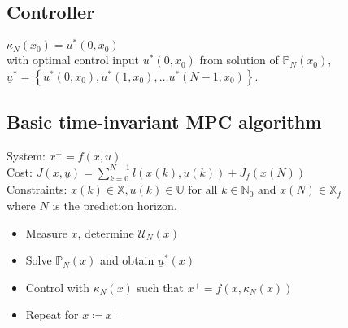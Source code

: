 \documentclass[english]{latex4ei/latex4ei_sheet}
\begin{document}
\begin{sectionbox}

\subsection{Controller}
$\kappa_{N}\left(x_{0}\right)=u^{*}\left(0, x_{0}\right)$ \\ 
with optimal control input $u^{*}\left(0, x_{0}\right)$ from solution of $\mathbb{P}_{N}\left(x_{0}\right)$, \\$\underline{u}^{*}=\left\{u^{*}\left(0, x_{0}\right), u^{*}\left(1, x_{0}\right), \ldots u^{*}\left(N-1, x_{0}\right)\right\}$.\\

\subsection{Basic time-invariant MPC algorithm}
System: $x^{+}=f(x, u)$\\ 
Cost: $J(x, \underline{u})=\sum\limits_{k=0}^{N-1} l(x(k), u(k))+J_{f}(x(N))$ \\
Constraints: $x(k) \in \mathbb{X}, u(k) \in \mathbb{U} \text { for all } k \in \mathbb{N}_{0} \text { and } x(N) \in \mathbb{X}_{f}$ \\
where $N$ is the prediction horizon.\\
\begin{itemize}
    \item Measure $x$, determine $\mathcal{U}_N(x)$
    \item Solve $\mathbb{P}_N(x)$ and obtain $\underline{u}^*(x)$
    \item Control with $\kappa_N(x)$ such that $x^+=f(x,\kappa_N(x))$
    \item Repeat for $x\coloneqq x^+$
\end{itemize}\\


\end{sectionbox}
\end{document}
